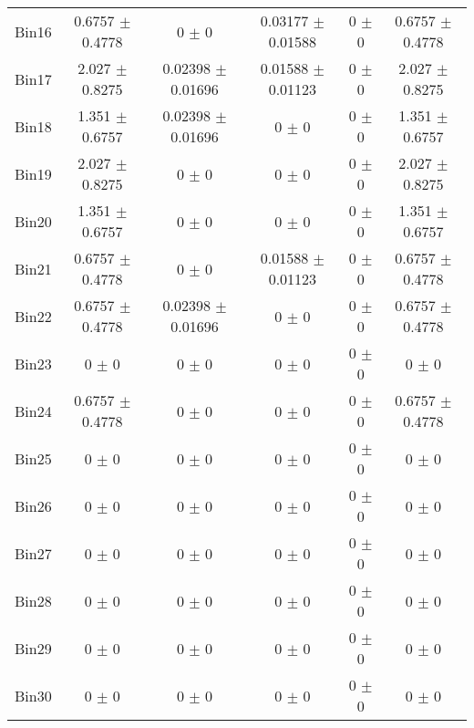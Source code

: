 \begin{tabular}{@{\extracolsep{4pt}}lccccc@{}}
     Bin16 & 0.6757 $\pm$ 0.4778 & 0 $\pm$ 0 & 0.03177 $\pm$ 0.01588 & 0 $\pm$ 0 & 0.6757 $\pm$ 0.4778 \\ 
     Bin17 & 2.027 $\pm$ 0.8275 & 0.02398 $\pm$ 0.01696 & 0.01588 $\pm$ 0.01123 & 0 $\pm$ 0 & 2.027 $\pm$ 0.8275 \\ 
     Bin18 & 1.351 $\pm$ 0.6757 & 0.02398 $\pm$ 0.01696 & 0 $\pm$ 0 & 0 $\pm$ 0 & 1.351 $\pm$ 0.6757 \\ 
     Bin19 & 2.027 $\pm$ 0.8275 & 0 $\pm$ 0 & 0 $\pm$ 0 & 0 $\pm$ 0 & 2.027 $\pm$ 0.8275 \\ 
     Bin20 & 1.351 $\pm$ 0.6757 & 0 $\pm$ 0 & 0 $\pm$ 0 & 0 $\pm$ 0 & 1.351 $\pm$ 0.6757 \\ 
     Bin21 & 0.6757 $\pm$ 0.4778 & 0 $\pm$ 0 & 0.01588 $\pm$ 0.01123 & 0 $\pm$ 0 & 0.6757 $\pm$ 0.4778 \\ 
     Bin22 & 0.6757 $\pm$ 0.4778 & 0.02398 $\pm$ 0.01696 & 0 $\pm$ 0 & 0 $\pm$ 0 & 0.6757 $\pm$ 0.4778 \\ 
     Bin23 & 0 $\pm$ 0 & 0 $\pm$ 0 & 0 $\pm$ 0 & 0 $\pm$ 0 & 0 $\pm$ 0 \\ 
     Bin24 & 0.6757 $\pm$ 0.4778 & 0 $\pm$ 0 & 0 $\pm$ 0 & 0 $\pm$ 0 & 0.6757 $\pm$ 0.4778 \\ 
     Bin25 & 0 $\pm$ 0 & 0 $\pm$ 0 & 0 $\pm$ 0 & 0 $\pm$ 0 & 0 $\pm$ 0 \\ 
     Bin26 & 0 $\pm$ 0 & 0 $\pm$ 0 & 0 $\pm$ 0 & 0 $\pm$ 0 & 0 $\pm$ 0 \\ 
     Bin27 & 0 $\pm$ 0 & 0 $\pm$ 0 & 0 $\pm$ 0 & 0 $\pm$ 0 & 0 $\pm$ 0 \\ 
     Bin28 & 0 $\pm$ 0 & 0 $\pm$ 0 & 0 $\pm$ 0 & 0 $\pm$ 0 & 0 $\pm$ 0 \\ 
     Bin29 & 0 $\pm$ 0 & 0 $\pm$ 0 & 0 $\pm$ 0 & 0 $\pm$ 0 & 0 $\pm$ 0 \\ 
     Bin30 & 0 $\pm$ 0 & 0 $\pm$ 0 & 0 $\pm$ 0 & 0 $\pm$ 0 & 0 $\pm$ 0 \\ 
\hline\hline
  \end{tabular}
